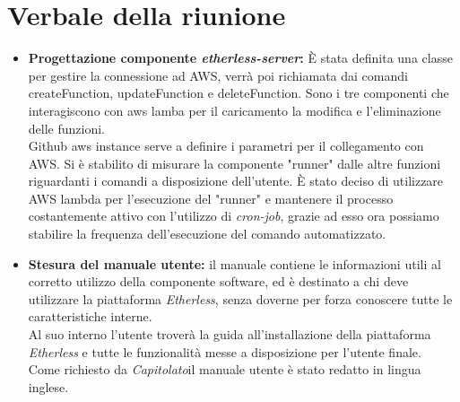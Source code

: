 \section{Verbale della riunione}
	\begin{itemize}
		\item \textbf{Progettazione componente \textit{etherless-server}:} 
		È stata definita una classe per gestire la connessione ad AWS, verrà poi richiamata dai comandi createFunction, updateFunction e deleteFunction. Sono i tre componenti che interagiscono con aws lamba per il caricamento la modifica e l'eliminazione delle funzioni.\\
		Github aws instance serve a definire i parametri per il collegamento con AWS.
		Si è stabilito di misurare la componente "runner" dalle altre funzioni riguardanti i comandi a disposizione dell'utente.
		È stato deciso di utilizzare AWS lambda per l'esecuzione del "runner" e mantenere il processo costantemente attivo con l'utilizzo di \textit{cron-job\glos}, grazie ad esso ora possiamo stabilire la frequenza dell'esecuzione del comando automatizzato.
		
		\item \textbf{Stesura del manuale utente:} 
		il manuale contiene le informazioni utili al corretto utilizzo della componente software, ed è destinato a chi deve utilizzare la piattaforma \textit{Etherless}, senza doverne per forza conoscere tutte le caratteristiche interne.\\
		Al suo interno l'utente troverà la guida all'installazione della piattaforma \textit{Etherless} e tutte le funzionalità messe a disposizione per l'utente finale.\\
		Come richiesto da \textit{Capitolato}\glo il manuale utente è stato redatto in lingua inglese.
		
	\end{itemize}